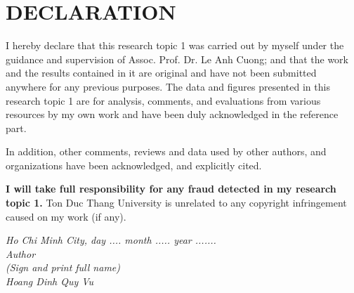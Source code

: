 \chapter*{DECLARATION}
I hereby declare that this research topic 1 was carried out by myself under the guidance and supervision of Assoc. Prof. Dr. Le Anh Cuong; and that the work and the results contained in it are original and have not been submitted anywhere for any previous purposes. The data and figures presented in this research topic 1 are for analysis, comments, and evaluations from various resources by my own work and have been duly acknowledged in the reference part.

In addition, other comments, reviews and data used by other authors, and organizations have been acknowledged, and explicitly cited.

\textbf{I will take full responsibility for any fraud detected in my research topic 1.} Ton Duc Thang University is unrelated to any copyright infringement caused on my work (if any).

\vspace*{1cm}
\begin{flushright}
	\begin{minipage}{8.75cm}
		\centering\itshape
		Ho Chi Minh City, day .... month .....  year .......\\
		Author\\[3cm]
		(Sign and print full name)\\
		Hoang Dinh Quy Vu
	\end{minipage}
\end{flushright}
\newpage